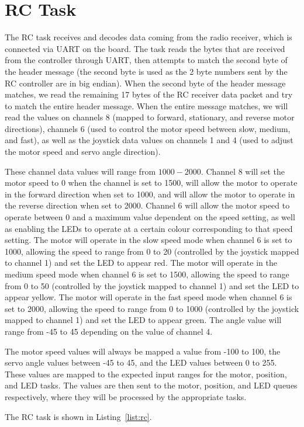 \section*{RC Task}

The RC task receives and decodes data coming from the radio receiver, which is connected via UART on the board. The task reads the bytes that are received from the controller through UART, then attempts to match the second byte of the header message (the second byte is used as the 2 byte numbers sent by the RC controller are in big endian). When the second byte of the header message matches, we read the remaining 17 bytes of the RC receiver data packet and try to match the entire header message. When the entire message matches, we will read the values on channels 8 (mapped to forward, stationary, and reverse motor directions), channels 6 (used to control the motor speed between slow, medium, and fast), as well as the joystick data values on channels 1 and 4 (used to adjust the motor speed and servo angle direction).

These channel data values will range from $1000-2000$. Channel 8 will set the motor speed to 0 when the channel is set to 1500, will allow the motor to operate in the forward direction when set to 1000, and will allow the motor to operate in the reverse direction when set to 2000. Channel 6 will allow the motor speed to operate between 0 and a maximum value dependent on the speed setting, as well as enabling the LEDs to operate at a certain colour corresponding to that speed setting. The motor will operate in the slow speed mode when channel 6 is set to 1000, allowing the speed to range from 0 to 20 (controlled by the joystick mapped to channel 1) and set the LED to appear red. The motor will operate in the medium speed mode when channel 6 is set to 1500, allowing the speed to range from 0 to 50 (controlled by the joystick mapped to channel 1) and set the LED to appear yellow. The motor will operate in the fast speed mode when channel 6 is set to 2000, allowing the speed to range from 0 to 1000 (controlled by the joystick mapped to channel 1) and set the LED to appear green. The angle value will range from -45 to 45 depending on the value of channel 4.

The motor speed values will always be mapped a value from -100 to 100, the servo angle values between -45 to 45, and the LED values between 0 to 255. These values are mapped to the expected input ranges for the motor, position, and LED tasks. The values are then sent to the motor, position, and LED queues respectively, where they will be processed by the appropriate tasks.

The RC task is shown in Listing~\ref{list:rc}.

